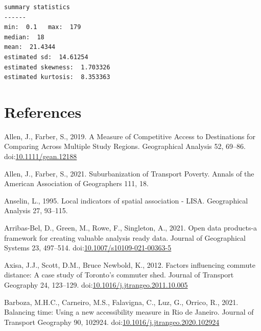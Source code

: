 \documentclass[]{elsarticle} %
\newlength{\cslhangindent}
\newlength{\cslentryspacingunit} %
\newenvironment{CSLReferences}[2] %
 {%
  \setlength{\parindent}{0pt}
  \ifodd #1
  \let\oldpar\par
  \def\par{\hangindent=\cslhangindent\oldpar}
  \fi
  \setlength{\parskip}{#2\cslentryspacingunit}
 }%
 {}
\begin{document}
\begin{verbatim}
summary statistics
------
min:  0.1   max:  179 
median:  18 
mean:  21.4344 
estimated sd:  14.61254 
estimated skewness:  1.703326 
estimated kurtosis:  8.353363 
\end{verbatim}

\newpage

\hypertarget{references}{%
\section*{References}\label{references}}

\hypertarget{refs}{}
\begin{CSLReferences}{1}{0}
\leavevmode{}%
Allen, J., Farber, S., 2019. A Measure of Competitive Access to
Destinations for Comparing Across Multiple Study Regions. Geographical
Analysis 52, 69--86.
doi:\href{https://doi.org/10.1111/gean.12188}{10.1111/gean.12188}

\leavevmode{}%
Allen, J., Farber, S., 2021. Suburbanization of {Transport} {Poverty}.
Annals of the American Association of Geographers 111, 18.

\leavevmode{}%
Anselin, L., 1995. Local indicators of spatial association - LISA.
Geographical Analysis 27, 93--115.

\leavevmode{}%
Arribas-Bel, D., Green, M., Rowe, F., Singleton, A., 2021. Open data
products-a framework for creating valuable analysis ready data. Journal
of Geographical Systems 23, 497--514.
doi:\href{https://doi.org/10.1007/s10109-021-00363-5}{10.1007/s10109-021-00363-5}

\leavevmode{}%
Axisa, J.J., Scott, D.M., Bruce Newbold, K., 2012. Factors influencing
commute distance: A case study of {Toronto}'s commuter shed. Journal of
Transport Geography 24, 123--129.
doi:\href{https://doi.org/10.1016/j.jtrangeo.2011.10.005}{10.1016/j.jtrangeo.2011.10.005}

\leavevmode{}%
Barboza, M.H.C., Carneiro, M.S., Falavigna, C., Luz, G., Orrico, R.,
2021. Balancing time: {Using} a new accessibility measure in {Rio} de
{Janeiro}. Journal of Transport Geography 90, 102924.
doi:\href{https://doi.org/10.1016/j.jtrangeo.2020.102924}{10.1016/j.jtrangeo.2020.102924}


\end{CSLReferences}
\end{document}
